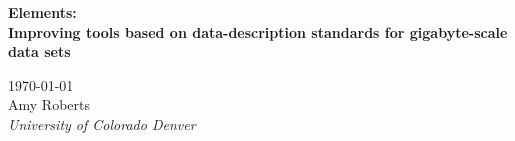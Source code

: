 \begin{titlepage}

\begin{center}
\textbf{\Huge Elements:}\\[0.3cm]
\textbf{\Huge Improving tools based on data-description standards  for gigabyte-scale data sets}\\[0.8cm]

\begin{figure}
\begin{center}
\end{center}
\end{figure}

\textrm{\today}\\[1.8cm]

\textrm{\LARGE Amy Roberts}\\[0.9cm]
\textit{\Large
University of Colorado Denver} 

\end{center}


\end{titlepage}